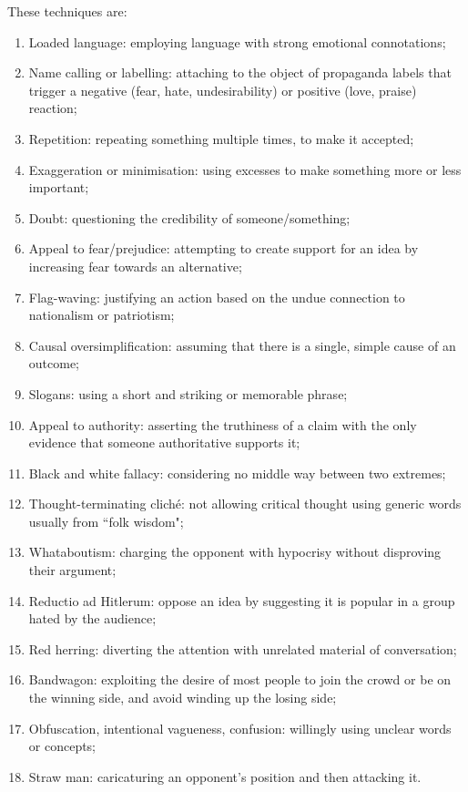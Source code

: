These techniques are:
\begin{enumerate}
    \item Loaded language: employing language with strong emotional connotations;
    \item Name calling or labelling: attaching to the object of propaganda labels that trigger a negative (fear, hate, undesirability) or positive (love, praise) reaction;
    \item Repetition: repeating something multiple times, to make it accepted;
    \item Exaggeration or minimisation: using excesses to make something more or less important;
    \item Doubt: questioning the credibility of someone/something;
    \item Appeal to fear/prejudice: attempting to create support for an idea by increasing fear towards an alternative;
    \item Flag-waving: justifying an action based on the undue connection to nationalism or patriotism;
    \item Causal oversimplification: assuming that there is a single, simple cause of an outcome;
    \item Slogans: using a short and striking or memorable phrase;
    \item Appeal to authority: asserting the truthiness of a claim with the only evidence that someone authoritative supports it;
    \item Black and white fallacy: considering no middle way between two extremes;
    \item Thought-terminating cliché: not allowing critical thought using generic words usually from ``folk wisdom";
    \item Whataboutism: charging the opponent with hypocrisy without disproving their argument;
    \item Reductio ad Hitlerum: oppose an idea by suggesting it is popular in a group hated by the audience;
    \item Red herring: diverting the attention with unrelated material of conversation;
    \item Bandwagon: exploiting the desire of most people to join the crowd or be on the winning side, and avoid winding up the losing side;
    \item Obfuscation, intentional vagueness, confusion: willingly using unclear words or concepts; 
    \item Straw man: caricaturing an opponent's position and then attacking it.
\end{enumerate}



